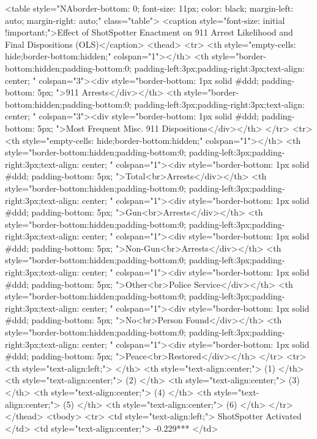 <table style="NAborder-bottom: 0; font-size: 11px; color: black; margin-left: auto; margin-right: auto;" class="table">
<caption style="font-size: initial !important;">\label{arrest_prob}Effect of ShotSpotter Enactment on 911 Arrest Likelihood and Final Dispositions (OLS)</caption>
 <thead>
<tr>
<th style="empty-cells: hide;border-bottom:hidden;" colspan="1"></th>
<th style="border-bottom:hidden;padding-bottom:0; padding-left:3px;padding-right:3px;text-align: center; " colspan="3"><div style="border-bottom: 1px solid #ddd; padding-bottom: 5px; ">911 Arrests</div></th>
<th style="border-bottom:hidden;padding-bottom:0; padding-left:3px;padding-right:3px;text-align: center; " colspan="3"><div style="border-bottom: 1px solid #ddd; padding-bottom: 5px; ">Most Frequent Misc. 911 Dispositions</div></th>
</tr>
<tr>
<th style="empty-cells: hide;border-bottom:hidden;" colspan="1"></th>
<th style="border-bottom:hidden;padding-bottom:0; padding-left:3px;padding-right:3px;text-align: center; " colspan="1"><div style="border-bottom: 1px solid #ddd; padding-bottom: 5px; ">Total<br>Arrests</div></th>
<th style="border-bottom:hidden;padding-bottom:0; padding-left:3px;padding-right:3px;text-align: center; " colspan="1"><div style="border-bottom: 1px solid #ddd; padding-bottom: 5px; ">Gun<br>Arrests</div></th>
<th style="border-bottom:hidden;padding-bottom:0; padding-left:3px;padding-right:3px;text-align: center; " colspan="1"><div style="border-bottom: 1px solid #ddd; padding-bottom: 5px; ">Non-Gun<br>Arrests</div></th>
<th style="border-bottom:hidden;padding-bottom:0; padding-left:3px;padding-right:3px;text-align: center; " colspan="1"><div style="border-bottom: 1px solid #ddd; padding-bottom: 5px; ">Other<br>Police Service</div></th>
<th style="border-bottom:hidden;padding-bottom:0; padding-left:3px;padding-right:3px;text-align: center; " colspan="1"><div style="border-bottom: 1px solid #ddd; padding-bottom: 5px; ">No<br>Person Found</div></th>
<th style="border-bottom:hidden;padding-bottom:0; padding-left:3px;padding-right:3px;text-align: center; " colspan="1"><div style="border-bottom: 1px solid #ddd; padding-bottom: 5px; ">Peace<br>Restored</div></th>
</tr>
  <tr>
   <th style="text-align:left;">   </th>
   <th style="text-align:center;"> (1) </th>
   <th style="text-align:center;"> (2) </th>
   <th style="text-align:center;"> (3) </th>
   <th style="text-align:center;"> (4) </th>
   <th style="text-align:center;"> (5) </th>
   <th style="text-align:center;"> (6) </th>
  </tr>
 </thead>
<tbody>
  <tr>
   <td style="text-align:left;"> ShotSpotter Activated </td>
   <td style="text-align:center;"> -0.229*** </td>
